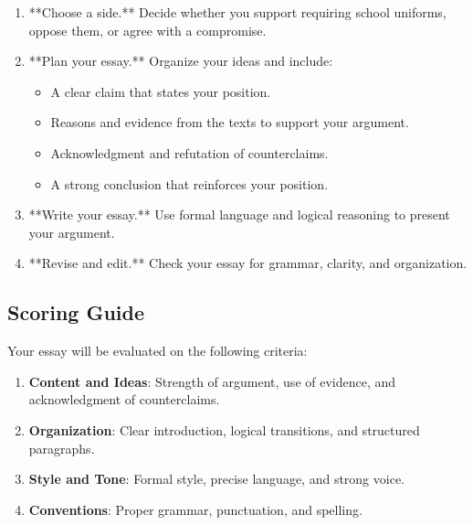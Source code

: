 \documentclass[12pt]{article}
\begin{document}
\begin{enumerate}
    \item **Choose a side.** Decide whether you support requiring school uniforms, oppose them, or agree with a compromise.
    \item **Plan your essay.** Organize your ideas and include:
    \begin{itemize}
        \item A clear claim that states your position.
        \item Reasons and evidence from the texts to support your argument.
        \item Acknowledgment and refutation of counterclaims.
        \item A strong conclusion that reinforces your position.
    \end{itemize}
    \item **Write your essay.** Use formal language and logical reasoning to present your argument.
    \item **Revise and edit.** Check your essay for grammar, clarity, and organization.
\end{enumerate}

\subsection*{Scoring Guide}

Your essay will be evaluated on the following criteria:
\begin{enumerate}
    \item \textbf{Content and Ideas}: Strength of argument, use of evidence, and acknowledgment of counterclaims.
    \item \textbf{Organization}: Clear introduction, logical transitions, and structured paragraphs.
    \item \textbf{Style and Tone}: Formal style, precise language, and strong voice.
    \item \textbf{Conventions}: Proper grammar, punctuation, and spelling.
\end{enumerate}
\end{document}
